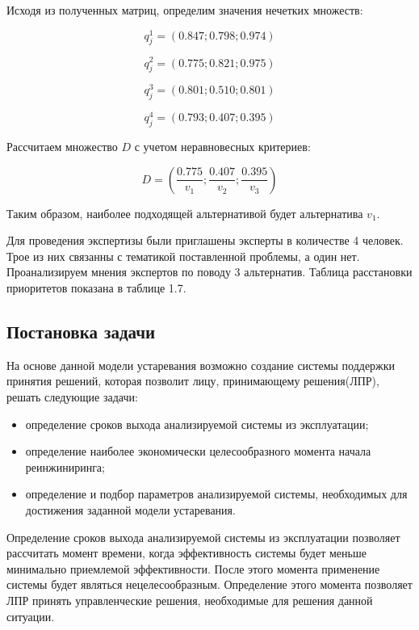 Исходя из полученных матриц, определим значения нечетких множеств:

\begin{equation}
    q^1_j=(0.847;0.798;0.974) 
\end{equation}

\begin{equation}
    q^2_j=(0.775;0.821;0.975)
\end{equation}

\begin{equation}
    q^3_j=(0.801;0.510;0.801)
\end{equation}

\begin{equation}
    q^4_j=(0.793;0.407;0.395)
\end{equation}

Рассчитаем множество $D$ с учетом неравновесных критериев:

\begin{equation}
    D=(\frac{0.775}{v_1};\frac{0.407}{v_2};\frac{0.395}{v_3})
\end{equation}

Таким образом, наиболее подходящей альтернативой будет альтернатива $v_1$.

Для проведения экспертизы были приглашены эксперты в количестве 4 человек. Трое из них связанны с тематикой поставленной проблемы, а один нет.
Проанализируем мнения экспертов по поводу 3 альтернатив. Таблица расстановки приоритетов показана в таблице 1.7. 

\subsection{Постановка задачи}
На основе данной модели устаревания возможно создание системы поддержки принятия решений, которая позволит лицу, принимающему решения(ЛПР), решать следующие задачи:
\begin{itemize}
    \item определение сроков выхода анализируемой системы из эксплуатации;
    \item определение наиболее экономически целесообразного момента начала реинжиниринга;
    \item определение и подбор параметров анализируемой системы, необходимых для достижения заданной модели устаревания.
\end{itemize}

Определение сроков выхода анализируемой системы из эксплуатации позволяет рассчитать момент времени, когда эффективность системы будет меньше минимально приемлемой эффективности. 
После этого момента применение системы будет являться нецелесообразным. Определение этого момента позволяет ЛПР принять управленческие решения, необходимые для решения данной ситуации.

